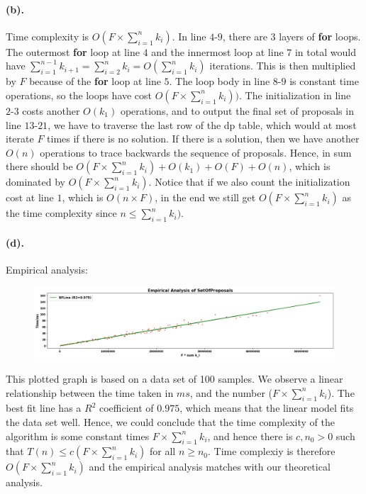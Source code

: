 \documentclass[12pt]{article}
\begin{document}
\paragraph{(b).} Time complexity is \(O(F \times \sum_{i=1}^{n} k_i)\). In line \(4\text{-}9\), there are \(3\) layers of \textbf{for} loops. The outermost \textbf{for} loop at line \(4\) and the innermost loop at line \(7\) in total would have \(\sum_{i=1}^{n-1} k_{i+1} = \sum_{i=2}^{n} k_{i} = O(\sum_{i=1}^{n} k_{i})\) iterations. This is then multiplied by \(F\) because of the \textbf{for} loop at line \(5\). The loop body in line \(8\text{-}9\) is constant time operations, so the loops have cost \(O(F \times \sum_{i=1}^{n} k_i))\). The initialization in line \(2\textbf{-}3\) costs another \(O(k_1)\) operations, and to output the final set of proposals in line \(13\text{-}21\), we have to traverse the last row of the dp table, which would at most iterate \(F\) times if there is no solution. If there is a solution, then we have another \(O(n)\) operations to trace backwards the sequence of proposals. Hence, in sum there should be \(O(F \times \sum_{i=1}^{n} k_i) + O(k_1) + O(F) + O(n)\), which is dominated by \(O(F \times \sum_{i=1}^{n} k_i)\). Notice that if we also count the initialization cost at line \(1\), which is \(O(n \times F)\), in the end we still get \(O(F \times \sum_{i=1}^{n} k_i)\) as the time complexity since \(n \leq \sum_{i=1}^{n} k_i)\).

\paragraph{(d).}
Empirical analysis:
\begin{figure}[H]
     \centering
     \includegraphics[width = \textwidth]{q6d.png}
\end{figure}
\noindent This plotted graph is based on a data set of 100 samples. We observe a linear relationship between the time taken in \(ms\), and the number  (\(F \times \sum_{i=1}^n k_i\)). The best fit line has a \(R^2\) coefficient of \(0.975\), which means that the linear model fits the data set well. Hence, we could conclude that the time complexity of the algorithm is some constant times \(F \times \sum_{i=1}^n k_i\), and hence there is \(c, n_0 > 0\) such that \(T(n) \leq c(F\times \sum_{i=1}^n k_i)\) for all \(n \geq n_0\). Time complexiy is therefore \(O(F \times \sum_{i=1}^n k_i)\) and the empirical analysis matches with our theoretical analysis. 
\end{document}
